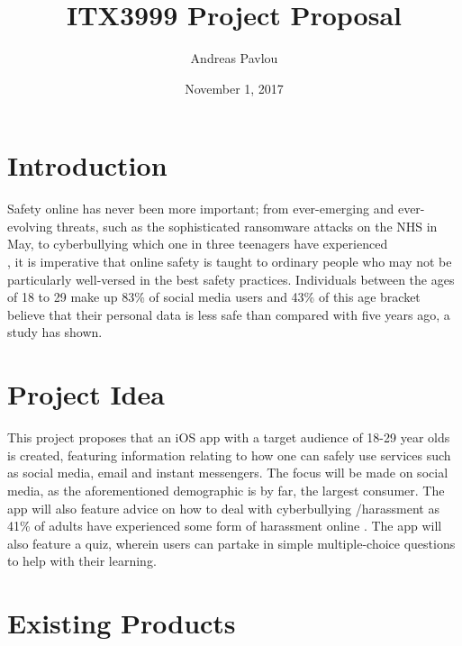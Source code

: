 \documentclass{article}
\author{Andreas Pavlou}
\title{ITX3999 Project Proposal}
\date{November 1, 2017}
\begin{document}
\maketitle
\newpage



\section{Introduction}

Safety online has never been more important; from ever-emerging and ever-evolving threats, such as the sophisticated ransomware attacks on the NHS in May, to cyberbullying which one in three teenagers have experienced \\
\cite{association_number_2014}, it is imperative that online safety is taught to ordinary people who may not be particularly well-versed in the best safety practices. Individuals between the ages of 18 to 29 make up 83\% of social media users and 43\% of this age bracket believe that their personal data is less safe than compared with five years ago, a study  \cite{pew_research_2012} has shown. 



\section{Project Idea}

This project proposes that an iOS app with a target audience of 18-29 year olds is created, featuring information relating to how one can safely use services such as social media, email and instant messengers. The focus will be made on social media, as the aforementioned demographic is by far, the largest consumer. The app will also feature advice on how to deal with cyberbullying /harassment as 41\% of adults have experienced some form of harassment online \cite{duggan_online_2017}. The app will also feature a quiz, wherein users can partake in simple multiple-choice questions to help with their learning.

\section{Existing Products} 
\end{document}
